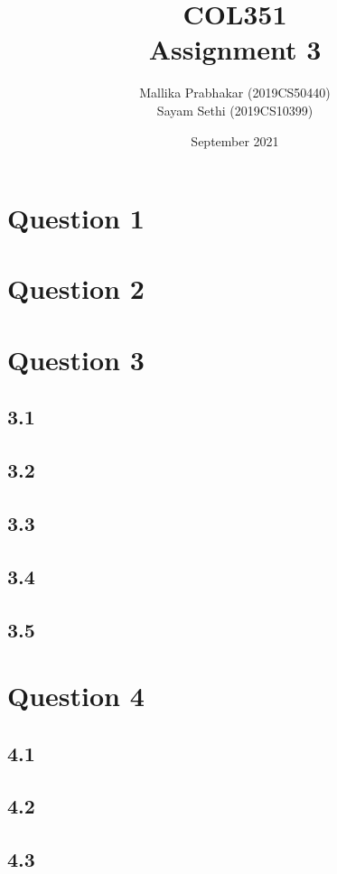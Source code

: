 \documentclass[11pt]{article}
\title{COL351\\Assignment 3}
\author{Mallika Prabhakar (2019CS50440)\\Sayam Sethi (2019CS10399)}
\date{September 2021}
\begin{document}
\maketitle

\tableofcontents


\newpage
\section{Question 1}



\newpage
\section{Question 2}



\newpage
\section{Question 3}

\subsection{3.1}


\subsection{3.2}


\subsection{3.3}


\subsection{3.4}


\subsection{3.5}


\newpage
\section{Question 4}

\subsection{4.1}


\subsection{4.2}


\subsection{4.3}

\end{document}
